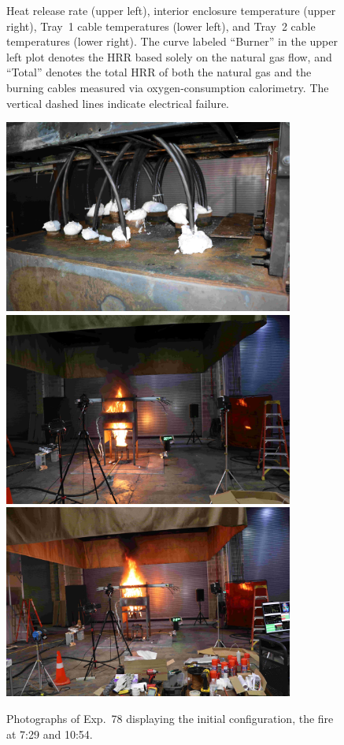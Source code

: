 \begin{figure}[H]
\caption[HRR and temperatures of Exp.~78]{Heat release rate (upper left), interior enclosure temperature (upper right), Tray~1 cable temperatures (lower left), and Tray~2 cable temperatures (lower right). The curve labeled ``Burner'' in the upper left plot denotes the HRR based solely on the natural gas flow, and ``Total'' denotes the total HRR of both the natural gas and the burning cables measured via oxygen-consumption calorimetry. The vertical dashed lines indicate electrical failure.}
\label{fig:Test_78}
\end{figure}

\begin{figure}[p]
\centering
\includegraphics[height=2.50in]{../FIGURES/Test_78_Photo_1} \\ \vspace{0.1in}
\includegraphics[height=2.50in]{../FIGURES/Test_78_Photo_2} \\ \vspace{0.1in}
\includegraphics[height=2.50in]{../FIGURES/Test_78_Photo_3}
\caption[Photographs of Exp.~78]{Photographs of Exp.~78 displaying the initial configuration, the fire at 7:29 and 10:54.}
\label{fig:Test_78_photos}
\end{figure}


